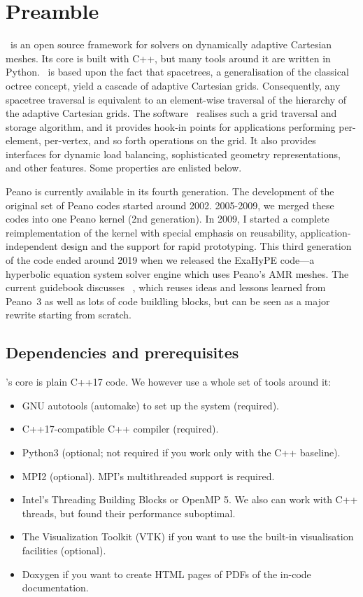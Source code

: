 \chapter{Preamble}


\Peano\ is an open source framework for solvers on dynamically adaptive
Cartesian meshes.
Its core is built with C++, but many tools around it are written in Python.
\Peano\  is based upon the fact that spacetrees, a generalisation of the classical octree concept, yield a cascade of adaptive Cartesian grids. Consequently, any spacetree traversal is equivalent to an element-wise traversal of the hierarchy of the adaptive Cartesian grids. The software \Peano\  realises such a grid traversal and storage algorithm, and it provides hook-in points for applications performing per-element, per-vertex, and so forth operations on the grid. It also provides interfaces for dynamic load balancing, sophisticated geometry representations, and other features. Some properties are enlisted below.

Peano is currently available in its fourth generation. 
The development of the original set of Peano codes started around 2002.
2005-2009, we merged these codes into one Peano kernel (2nd generation). 
In 2009, I started a complete reimplementation of the kernel with special
emphasis on reusability, application-independent design and the support for rapid prototyping. 
This third generation of the code ended around 2019 when we released the
ExaHyPE code---a hyperbolic equation system solver engine which uses Peano's
AMR meshes.
The current guidebook discusses \Peano\ , which reuses ideas and lessons learned
from Peano~3 as well as lots of code buildling blocks, but can be seen as a
major rewrite starting from scratch.


\section*{Dependencies and prerequisites}

\Peano's core is plain C++17 code. 
We however use a whole set of tools around it:

\begin{itemize}
  \item GNU autotools (automake) to set up the system (required).
  \item C++17-compatible C++ compiler (required).
  \item Python3 (optional; not required if you work only with the C++
  baseline).
  \item MPI2 (optional). MPI's multithreaded support is required.
  \item Intel's Threading Building Blocks or OpenMP 5. We also can work with C++
  threads, but found their performance suboptimal.
  \item The Visualization Toolkit (VTK) if you want to use the built-in
  visualisation facilities (optional).
  \item Doxygen if you want to create HTML pages of PDFs of the in-code
  documentation.
\end{itemize}


